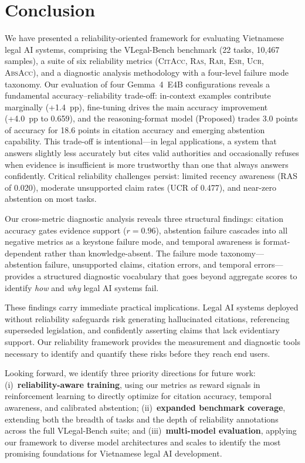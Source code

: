 \documentclass[11pt,a4paper]{article}
\newcommand{\system}{VLegal-Bench}
\newcommand{\model}{Gemma~4~E4B}
\newcommand{\citacc}{\textsc{CitAcc}}
\newcommand{\ras}{\textsc{Ras}}
\newcommand{\rar}{\textsc{Rar}}
\newcommand{\esr}{\textsc{Esr}}
\newcommand{\ucr}{\textsc{Ucr}}
\newcommand{\absacc}{\textsc{AbsAcc}}
\begin{document}
\section{Conclusion}
\label{sec:conclusion}

We have presented a reliability-oriented framework for evaluating Vietnamese legal AI systems, comprising the \system{} benchmark (22 tasks, 10{,}467 samples), a suite of six reliability metrics (\citacc, \ras, \rar, \esr, \ucr, \absacc), and a diagnostic analysis methodology with a four-level failure mode taxonomy.
Our evaluation of four \model{} configurations reveals a fundamental accuracy--reliability trade-off: in-context examples contribute marginally (+1.4~pp), fine-tuning drives the main accuracy improvement (+4.0~pp to 0.659), and the reasoning-format model (Proposed) trades 3.0 points of accuracy for 18.6 points in citation accuracy and emerging abstention capability.
This trade-off is intentional---in legal applications, a system that answers slightly less accurately but cites valid authorities and occasionally refuses when evidence is insufficient is more trustworthy than one that always answers confidently.
Critical reliability challenges persist: limited recency awareness (RAS of 0.020), moderate unsupported claim rates (UCR of 0.477), and near-zero abstention on most tasks.

Our cross-metric diagnostic analysis reveals three structural findings: citation accuracy gates evidence support ($r = 0.96$), abstention failure cascades into all negative metrics as a keystone failure mode, and temporal awareness is format-dependent rather than knowledge-absent.
The failure mode taxonomy---abstention failure, unsupported claims, citation errors, and temporal errors---provides a structured diagnostic vocabulary that goes beyond aggregate scores to identify \emph{how} and \emph{why} legal AI systems fail.

These findings carry immediate practical implications.
Legal AI systems deployed without reliability safeguards risk generating hallucinated citations, referencing superseded legislation, and confidently asserting claims that lack evidentiary support.
Our reliability framework provides the measurement and diagnostic tools necessary to identify and quantify these risks before they reach end users.

Looking forward, we identify three priority directions for future work:
(i)~\textbf{reliability-aware training}, using our metrics as reward signals in reinforcement learning to directly optimize for citation accuracy, temporal awareness, and calibrated abstention;
(ii)~\textbf{expanded benchmark coverage}, extending both the breadth of tasks and the depth of reliability annotations across the full \system{} suite; and
(iii)~\textbf{multi-model evaluation}, applying our framework to diverse model architectures and scales to identify the most promising foundations for Vietnamese legal AI development.
\end{document}
